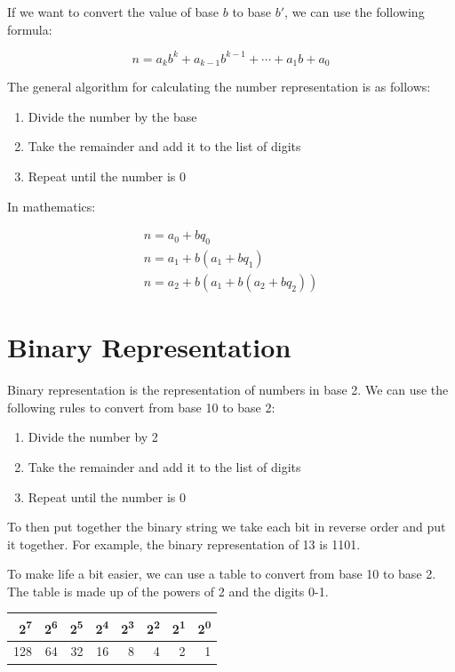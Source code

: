 \documentclass[11pt]{article}
\begin{document}
If we want to convert the value of base \(b\) to base \(b'\), we can use the following formula:

\[
n = a_k b^k + a_{k-1} b^{k-1} + \cdots + a_1 b + a_0
\]

The general algorithm for calculating the number representation is as follows:
\begin{enumerate}
\item Divide the number by the base
\item Take the remainder and add it to the list of digits
\item Repeat until the number is 0
\end{enumerate}

In mathematics:

\begin{align}
n = a_0 + bq_0 \\
n = a_1 + b(a_1 + bq_1) \\
n = a_2 + b(a_1 + b(a_2 + bq_2))
\end{align}


\section{Binary Representation}
\label{sec:org1a68b94}
Binary representation is the representation of numbers in base 2. We can use the following rules to convert from base 10 to base 2:
\begin{enumerate}
\item Divide the number by 2
\item Take the remainder and add it to the list of digits
\item Repeat until the number is 0
\end{enumerate}

To then put together the binary string we take each bit in reverse order and put it together. For example, the binary representation of 13 is 1101.

To make life a bit easier, we can use a table to convert from base 10 to base 2. The table is made up of the powers of 2 and the digits 0-1.
\begin{center}
\begin{tabular}{rrrrrrrr}
2\textsuperscript{7} & 2\textsuperscript{6} & 2\textsuperscript{5} & 2\textsuperscript{4} & 2\textsuperscript{3} & 2\textsuperscript{2} & 2\textsuperscript{1} & 2\textsuperscript{0}\\
\hline
128 & 64 & 32 & 16 & 8 & 4 & 2 & 1\\
\end{tabular}
\end{center}
\end{document}
